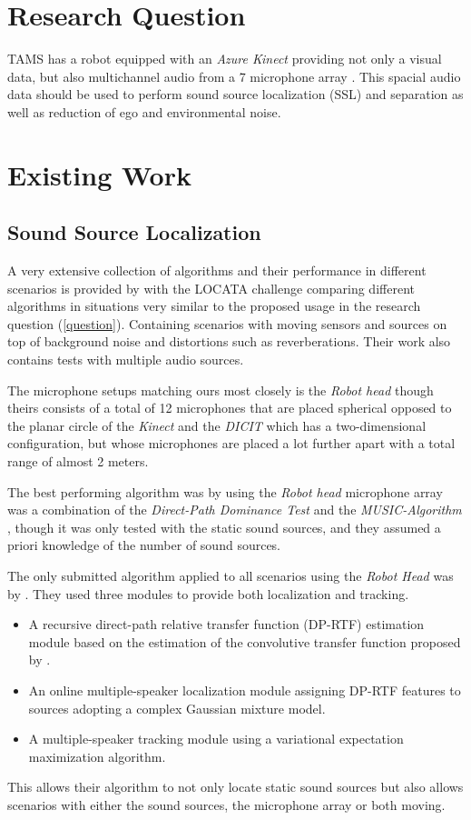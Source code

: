 \documentclass[
    fontsize=12pt,
    headings=small,
    parskip=half,           %
    bibliography=totoc,
    numbers=noenddot,       %
    open=any,               %
]{scrreprt}
\begin{document}
\chapter{Research Question}
\label{question}

TAMS has a robot equipped with an \emph{Azure Kinect} providing not only a visual data, but also multichannel audio from a 7 microphone array \cite{kinect}. This spacial audio data should be used to perform sound source localization (SSL) and separation as well as reduction of ego and environmental noise.

\chapter{Existing Work}
\section{Sound Source Localization}

A very extensive collection of algorithms and their performance in different scenarios is provided by \textcite{LOCATA} with the LOCATA challenge comparing different algorithms in situations very similar to the proposed usage in the research question (\autoref{question}). Containing scenarios with moving sensors and sources on top of background noise and distortions such as reverberations. Their work also contains tests with multiple audio sources.

The microphone setups matching ours most closely is the \emph{Robot head} though theirs consists of a total of 12 microphones that are placed spherical opposed to the planar circle of the \emph{Kinect} and the \emph{DICIT} which has a two-dimensional configuration, but whose microphones are placed a lot further apart with a total range of almost 2 meters.

The best performing algorithm was by \textcite{locata11} using the \emph{Robot head} microphone array was a combination of the \emph{Direct-Path Dominance Test} \cite{dpd} and the \emph{MUSIC-Algorithm} \cite{music}, though it was only tested with the static sound sources, and they assumed a priori knowledge of the number of sound sources.

The only submitted algorithm applied to all scenarios using the \emph{Robot Head} was by \textcite{locata4}. They used three modules to provide both localization and tracking.
\begin{itemize}
    \item A recursive direct-path relative transfer function (DP-RTF) estimation module based on the estimation of the convolutive transfer function proposed by \textcite{estimation_of_dprtf}.
    \item An online multiple-speaker localization module assigning DP-RTF features to sources adopting a complex Gaussian mixture model.
    \item A multiple-speaker tracking module using a variational expectation maximization algorithm.
\end{itemize}
This allows their algorithm to not only locate static sound sources but also allows scenarios with either the sound sources, the microphone array or both moving.
\end{document}
